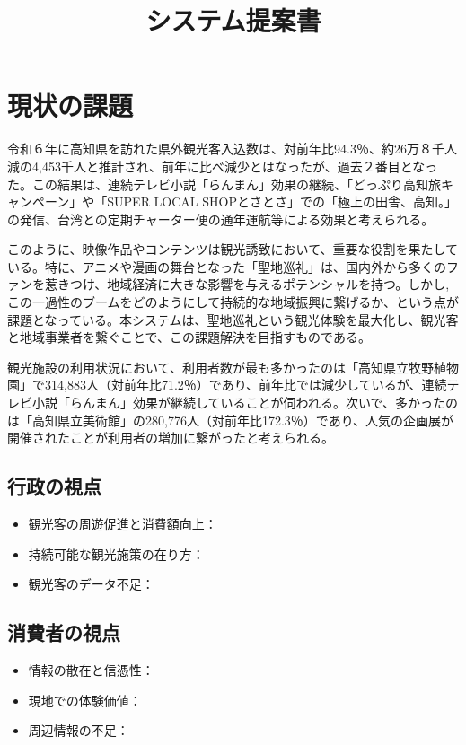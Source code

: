 \documentclass{docs}
\title{システム提案書}
\begin{document}
\section{現状の課題}
令和６年に高知県を訪れた県外観光客入込数は、対前年比94.3％、約26万８千人減の4,453千人と推計され、前年に比べ減少とはなったが、過去２番目となった。この結果は、連続テレビ小説「らんまん」効果の継続、「どっぷり高知旅キャンペーン」や「SUPER LOCAL SHOPとさとさ」での「極上の田舎、高知。」の発信、台湾との定期チャーター便の通年運航等による効果と考えられる。

このように、映像作品やコンテンツは観光誘致において、重要な役割を果たしている。特に、アニメや漫画の舞台となった「聖地巡礼」は、国内外から多くのファンを惹きつけ、地域経済に大きな影響を与えるポテンシャルを持つ。しかし,この一過性のブームをどのようにして持続的な地域振興に繋げるか、という点が課題となっている。本システムは、聖地巡礼という観光体験を最大化し、観光客と地域事業者を繋ぐことで、この課題解決を目指すものである。

観光施設の利用状況において、利用者数が最も多かったのは「高知県立牧野植物園」で314,883人（対前年比71.2％）であり、前年比では減少しているが、連続テレビ小説「らんまん」効果が継続していることが伺われる。次いで、多かったのは「高知県立美術館」の280,776人（対前年比172.3％）であり、人気の企画展が開催されたことが利用者の増加に繋がったと考えられる。

\subsection{行政の視点}
\begin{itemize}
    \item 観光客の周遊促進と消費額向上：
    \item 持続可能な観光施策の在り方：
    \item 観光客のデータ不足：
\end{itemize}

\subsection{消費者の視点}
\begin{itemize}
    \item 情報の散在と信憑性：
    \item 現地での体験価値：
    \item 周辺情報の不足：
\end{itemize}
\end{document}

